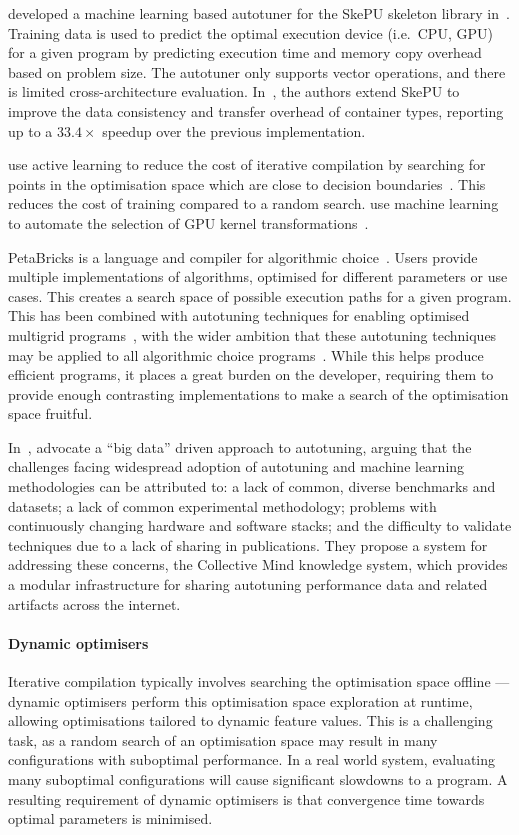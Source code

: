\citeauthor{Dastgeer2011} developed a machine learning based autotuner for the SkePU skeleton library in~\cite{Dastgeer2011}. Training data is used to predict the optimal execution device (i.e.\ CPU, GPU) for a given program by predicting execution time and memory copy overhead based on problem size. The autotuner only supports vector operations, and there is limited cross-architecture evaluation. In~\cite{Dastgeer2015a}, the authors extend SkePU to improve the data consistency and transfer overhead of container types, reporting up to a $33.4\times$ speedup over the previous implementation.

\citeauthor{Ogilvie2015} use active learning to reduce the cost of iterative compilation by searching for points in the optimisation space which are close to decision boundaries~\cite{Ogilvie2015}. This reduces the cost of training compared to a random search. \citeauthor{Wahib2015a} use machine learning to automate the selection of GPU kernel transformations~\cite{Wahib2015a}.

PetaBricks is a language and compiler for algorithmic choice~\cite{Ansel2009a}. Users provide multiple implementations of algorithms, optimised for different parameters or use cases. This creates a search space of possible execution paths for a given program. This has been combined with autotuning techniques for enabling optimised multigrid programs~\cite{Chan2009}, with the wider ambition that these autotuning techniques may be applied to all algorithmic choice programs~\cite{Ansel2014}. While this helps produce efficient programs, it places a great burden on the developer, requiring them to provide enough contrasting implementations to make a search of the optimisation space fruitful.

In~\cite{Saclay2010,Memon2013,Fursin2014}, \citeauthor{Fursin2014} advocate a ``big data'' driven approach to autotuning, arguing that the challenges facing widespread adoption of autotuning and machine learning methodologies can be attributed to: a lack of common, diverse benchmarks and datasets; a lack of common experimental methodology; problems with continuously changing hardware and software stacks; and the difficulty to validate techniques due to a lack of sharing in publications. They propose a system for addressing these concerns, the Collective Mind knowledge system, which provides a modular infrastructure for sharing autotuning performance data and related artifacts across the internet.


\paragraph{Dynamic optimisers} Iterative compilation typically involves searching the optimisation space offline --- dynamic optimisers perform this optimisation space exploration at runtime, allowing optimisations tailored to dynamic feature values. This is a challenging task, as a random search of an optimisation space may result in many configurations with suboptimal performance. In a real world system, evaluating many suboptimal configurations will cause significant slowdowns to a program. A resulting requirement of dynamic optimisers is that convergence time towards optimal parameters is minimised.

